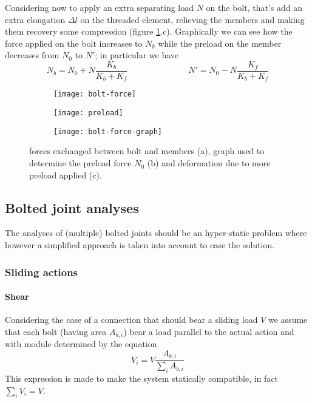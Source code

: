 	Considering now to apply an extra separating load $N$ on the bolt, that's add an extra elongation $\Delta l$ on the threaded element, relieving the members and making them recovery some compression (figure \ref{fig:preload}.c). Graphically we can see how the force applied on the bolt increases to $N_b$ while the preload on the member decreases from $N_0$ to $N'$; in particular we have
	\begin{equation} \label{eq:boltloadpretension}
		N_b = N_0 + N \frac{K_b}{K_b+K_f} \hspace{3cm} N' = N_0 - N \frac{K_f}{K_b+K_f}
	\end{equation}
	
	
	\begin{figure}[bht]
		\centering
		\begin{subfigure}{0.325\linewidth}
			\centering \texttt{[image: bolt-force]} \caption{} 
		\end{subfigure}
		\begin{subfigure}{0.325\linewidth}
			\centering \texttt{[image: preload]} \caption{} 
		\end{subfigure}
		\begin{subfigure}{0.325\linewidth}
			\centering \texttt{[image: bolt-force-graph]} \caption{} 
		\end{subfigure}
		\caption{forces exchanged between bolt and members (a), graph used to determine the preload force $N_0$ (b) and deformation due to more preload applied (c). } \label{fig:preload}
	\end{figure}
	
\subsection{Bolted joint analyses}
	The analyses of (multiple) bolted joints should be an hyper-static problem where however a simplified approach is taken into account to ease the solution.
\subsubsection*{Sliding actions}
	
	\paragraph{Shear} Considering the case of a connection that should bear a sliding load $V$ we assume that each bolt (having area $A_{b,i}$) bear a load parallel to the actual action and with module determined by the equation
	\begin{equation}
		V_i = V  \frac {A_{b,i}}{\sum_i A_{b,i}}
	\end{equation}
	This expression is made to make the system statically compatible, in fact $\sum_i V_i = V$.
	
